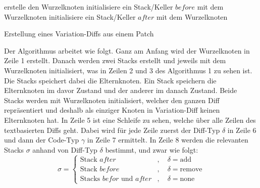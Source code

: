 \begin{algorithm}[H]
	\SetAlgoLined
	\DontPrintSemicolon
	erstelle den Wurzelknoten\;
	initialisiere ein Stack/Keller $before$ mit dem Wurzelknoten\;
	initialisiere ein Stack/Keller $after$ mit dem Wurzelknoten\;
	\;
	\caption{Erstellung eines Variation-Diffs aus einem Patch}
\end{algorithm}
Der Algorithmus arbeitet wie folgt. Ganz am Anfang  wird der Wurzelknoten in Zeile 1 erstellt. Danach werden zwei Stacks erstellt und jeweils mit dem Wurzelknoten initialisiert, was in Zeilen 2 und 3 des Algorithmus 1 zu sehen ist. Die Stacks speichert dabei die Elternknoten. Ein Stack speichern die Elternknoten im davor Zustand und der anderer im danach Zustand. Beide Stacks werden mit Wurzelknoten initialisiert, welcher den ganzen Diff repräsentiert und deshalb als einziger Knoten in Variation-Diff keinen Elternknoten hat. In Zeile 5 ist eine Schleife zu sehen, welche über alle Zeilen des textbasierten Diffs geht. Dabei wird für jede Zeile zuerst der Diff-Typ $\delta$ in Zeile 6 und dann der Code-Typ $\gamma$ in Zeile 7 ermittelt. In Zeile 8 werden die relevanten Stacks $\sigma$ anhand von Diff-Typ $\delta$ bestimmt, und zwar wie folgt:
\[ \sigma =
\begin{cases}
	\text{Stack } after      &, \quad \delta = \text{add}\\
	\text{Stack } before  &, \quad \delta = \text{remove}\\
	\text{Stacks } befor \text{ und } after &, \quad \delta = \text{none}
\end{cases}
\]
